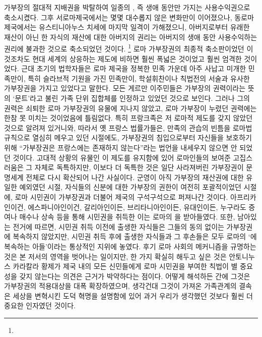 가부장의 절대적 지배권을 박탈하여
일종의 ,
즉 생애 동안만 가지는 사용수익권으로 축소시켰다.
그후 서로마제국에서는 몇몇 대수롭지 않은 변화만이 이어졌으나,
동로마제국에서는 유스티니아누스 치세에 마지막 일격이 가해졌으니,
아버지로부터 유래한 재산이 아닌 한
자식의 재산에 대한 아버지의 권리는
아버지의 생애 동안 사용수익하는 권리에 불과한 것으로 축소되었던 것이다.%
\footnote{}
로마 가부장권의 최종적 축소판이었던 이것조차도
현대 세계의 상응하는 제도에 비하면 훨씬 폭넓은 것이었고
훨씬 엄격한 것이었다.
근대 초기의 법학자들은 로마 제국을 정복한 민족 가운데
아주 사납고 미개한 민족만이, 특히 슬라브적 기원을 가진 민족만이,
학설휘찬이나 칙법전의 서술과 유사한
가부장권을 가지고 있었다고 말한다.
모든 게르만 이주민들은 가부장의 권력이라는 뜻의 `문트'라고 불린
가족 단위 집합체를 인정하고 있었던 것으로 보인다.
그러나 그의 권력은 쇠퇴한 로마 가부장권의 유물에 지나지 않았고,
로마 가부장이 누렸던 권력에는 한참 못 미치는 것이었음에 틀림없다.
특히 프랑크족은 저 로마적 제도를 갖지 않았던 것으로 알려져 있거니와,
따라서 옛 프랑스 법률가들은,
만족의 관습의 빈틈을 로마법 규칙으로 열심히 메우고 있던 시절에도,
가부장권의 침입으로부터 자신들을 보호하기 위해
``가부장권은 프랑스에는 존재하지 않는다''라는 법언을 내세우지 않으면 안 되었던 것이다.
고대적 상황의 유물인 이 제도를 유지함에 있어 로마인들의 보여준 고집스러움은
그 자체로 독특하지만, 이보다 더 독특한 것은
일단 사라져버린 가부장권이 문명세계 전체로 다시 확산되어 나간 사실이다.
군영이 아직 가부장의 재산권에 대한 유일한 예외였던 시절,
자식들의 신분에 대한 가부장의 권한이 여전히 포괄적이었던 시절에,
로마 시민권이 가부장권과 더불어 제국의 구석구석으로 퍼져나간 것이다.
아프리카인이건, 에스파니아인이건, 갈리아인이든, 브리타니아인이든, 유대인이든,
누구라도 증여나 매수나 상속 등을 통해 시민권을 취득한 이는
로마의 을 받아들였다.
또한, 남아있는 전거에 따르면, 시민권 취득 이전에 출생한 자식들은
그들의 동의 없이는 가부장권에 복속하지 않았지만,
시민권 취득 후에 출생한 자식들과 그 후손들은 모두 로마의
`에 복속하는 아들'이라는 통상적인 지위에 놓였다.
후기 로마 사회의 메커니즘을 규명하는 것은 본 저서의 영역을 벗어나는 일이지만,
한 가지 확실히 해두고 싶은 것은
안토니누스 카라칼라 황제가 제국 내의 모든 신민들에게 로마 시민권을 부여한
칙법이 별 중요성을 갖지 않는다는 의견은 근거가 박약하다는 점이다.
어떻게 해석하든 간에
그것은 가부장권의 적용대상을 대폭 확장하였으며,
생각건대 그것이 가져온 가족관계의 결속은
세상을 변혁시킨 도덕 혁명을 설명함에 있어
과거 우리가 생각했던 것보다 훨씬 더 중요한 인자였던 것이다.

